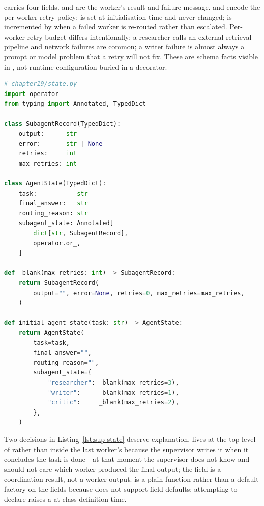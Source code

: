  carries four fields.  and 
are the worker's result and failure message.  and
 encode the per-worker retry policy: 
is set at initialisation time and never changed;  is
incremented by  when a failed worker is
re-routed rather than escalated. Per-worker retry budget differs
intentionally: a researcher calls an external retrieval pipeline and
network failures are common; a writer failure is almost always a prompt or
model problem that a retry will not fix. These are schema facts visible in
, not runtime configuration buried in a
decorator.

\begin{lstlisting}[language=Python,
  caption={State schema with \texttt{operator.or\_} reducer and per-worker record},
  label={lst:sup-state}]
# chapter19/state.py
import operator
from typing import Annotated, TypedDict

class SubagentRecord(TypedDict):
    output:      str
    error:       str | None
    retries:     int
    max_retries: int

class AgentState(TypedDict):
    task:           str
    final_answer:   str
    routing_reason: str
    subagent_state: Annotated[
        dict[str, SubagentRecord],
        operator.or_,
    ]

def _blank(max_retries: int) -> SubagentRecord:
    return SubagentRecord(
        output="", error=None, retries=0, max_retries=max_retries,
    )

def initial_agent_state(task: str) -> AgentState:
    return AgentState(
        task=task,
        final_answer="",
        routing_reason="",
        subagent_state={
            "researcher": _blank(max_retries=3),
            "writer":     _blank(max_retries=1),
            "critic":     _blank(max_retries=2),
        },
    )
\end{lstlisting}

Two decisions in Listing~\ref{lst:sup-state} deserve explanation.
 lives at the top level of  rather
than inside the last worker's  because the supervisor
writes it when it concludes the task is done---at that moment the
supervisor does not know and should not care which worker produced the
final output; the field is a coordination result, not a worker output.
 is a plain function rather than a default
factory on the  fields because  does not
support field defaults: attempting to declare  raises a
 at class definition time.

